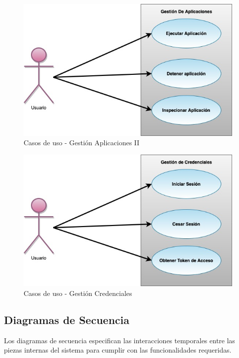 \documentclass[a4paper,11pt]{book}
\begin{document}
\begin{figure}[H] 
\centering 
\includegraphics[scale=0.50]{imagenes/casosUso2.jpg}
\caption{ Casos de uso - Gestión Aplicaciones II\cite{diagrama}  }  
\end{figure}

\begin{figure}[H] 
\centering 
\includegraphics[scale=0.50]{imagenes/casosUso3.jpg}
\caption{ Casos de uso - Gestión Credenciales\cite{diagrama}  }  
\end{figure}

\subsection{Diagramas de Secuencia}
Los diagramas de secuencia especifican las interacciones temporales entre las piezas internas del sistema para cumplir con las funcionalidades requeridas.  
\end{document}
